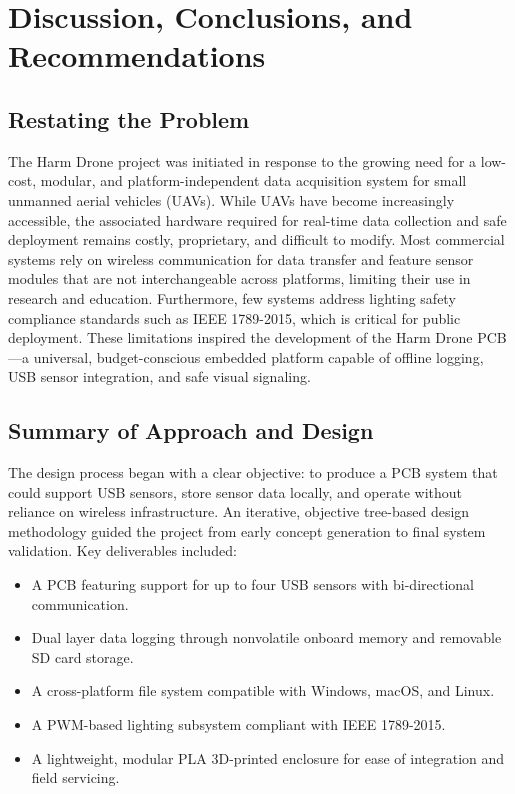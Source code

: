 \documentclass[12pt]{article}
\begin{document}
\section{Discussion, Conclusions, and Recommendations}
\subsection{Restating the Problem}

\par The Harm Drone project was initiated in response to the growing need for a low-cost, modular, and platform-independent data acquisition system for small unmanned aerial vehicles (UAVs). While UAVs have become increasingly accessible, the associated hardware required for real-time data collection and safe deployment remains costly, proprietary, and difficult to modify. Most commercial systems rely on wireless communication for data transfer and feature sensor modules that are not interchangeable across platforms, limiting their use in research and education. Furthermore, few systems address lighting safety compliance standards such as IEEE 1789-2015, which is critical for public deployment. These limitations inspired the development of the Harm Drone PCB—a universal, budget-conscious embedded platform capable of offline logging, USB sensor integration, and safe visual signaling.

\subsection{Summary of Approach and Design}

\par The design process began with a clear objective: to produce a PCB system that could support USB sensors, store sensor data locally, and operate without reliance on wireless infrastructure. An iterative, objective tree-based design methodology guided the project from early concept generation to final system validation. Key deliverables included:

\begin{itemize}
\item A PCB featuring support for up to four USB sensors with bi-directional communication.
\item Dual layer data logging through nonvolatile onboard memory and removable SD card storage.
\item A cross-platform file system compatible with Windows, macOS, and Linux.
\item A PWM-based lighting subsystem compliant with IEEE 1789-2015.
\item A lightweight, modular PLA 3D-printed enclosure for ease of integration and field servicing.
\end{itemize}
\end{document}
